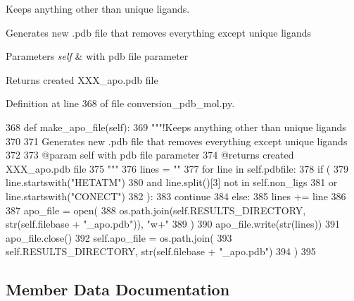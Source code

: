 Keeps anything other than unique ligands. 

Generates new .pdb file that removes everything except unique ligands


\begin{DoxyParams}{Parameters}
{\em self} & with pdb file parameter \\
\hline
\end{DoxyParams}
\begin{DoxyReturn}{Returns}
created X\+X\+X\+\_\+apo.\+pdb file 
\end{DoxyReturn}


Definition at line 368 of file conversion\+\_\+pdb\+\_\+mol.\+py.


\begin{DoxyCode}
368     \textcolor{keyword}{def }make\_apo\_file(self):
369         \textcolor{stringliteral}{"""!Keeps anything other than unique ligands}
370 \textcolor{stringliteral}{}
371 \textcolor{stringliteral}{        Generates new .pdb file that removes everything except unique ligands}
372 \textcolor{stringliteral}{}
373 \textcolor{stringliteral}{        @param self with pdb file parameter }
374 \textcolor{stringliteral}{        @returns created XXX\_apo.pdb file}
375 \textcolor{stringliteral}{        """}
376         lines = \textcolor{stringliteral}{""}
377         \textcolor{keywordflow}{for} line \textcolor{keywordflow}{in} self.pdbfile:
378             \textcolor{keywordflow}{if} (
379                 line.startswith(\textcolor{stringliteral}{"HETATM"})
380                 \textcolor{keywordflow}{and} line.split()[3] \textcolor{keywordflow}{not} \textcolor{keywordflow}{in} self.non\_ligs
381                 \textcolor{keywordflow}{or} line.startswith(\textcolor{stringliteral}{"CONECT"})
382             ):
383                 \textcolor{keywordflow}{continue}
384             \textcolor{keywordflow}{else}:
385                 lines += line
386 
387         apo\_file = open(
388             os.path.join(self.RESULTS\_DIRECTORY, str(self.filebase + \textcolor{stringliteral}{"\_apo.pdb"})), \textcolor{stringliteral}{"w+"}
389         )
390         apo\_file.write(str(lines))
391         apo\_file.close()
392         self.apo\_file = os.path.join(
393             self.RESULTS\_DIRECTORY, str(self.filebase + \textcolor{stringliteral}{"\_apo.pdb"})
394         )
395 
\end{DoxyCode}


\subsection{Member Data Documentation}
\mbox{\label{classfragalysis__api_1_1xcimporter_1_1conversion__pdb__mol_1_1pdb__apo_a9e655f451df734d5f78e8a41b8c47f89}} 
